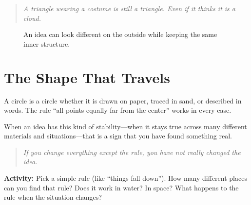 \documentclass[12pt]{book}
\begin{document}
\begin{quote}\itshape
A triangle wearing a costume is still a triangle.
Even if it thinks it is a cloud.
\end{quote}

\begin{figure}[h!]
\centering
{}
\caption{An idea can look different on the outside while keeping the same inner structure.}
\end{figure}

\section{The Shape That Travels}

A circle is a circle whether it is drawn on paper, traced in sand, or
described in words. The rule ``all points equally far from the center''
works in every case.

When an idea has this kind of stability---when it stays true across many
different materials and situations---that is a sign that you have found
something real.

\begin{quote}\itshape
If you change everything except the rule,
you have not really changed the idea.
\end{quote}

\textbf{Activity:} Pick a simple rule (like ``things fall down''). How many
different places can you find that rule? Does it work in water? In space?
What happens to the rule when the situation changes?
\end{document}
